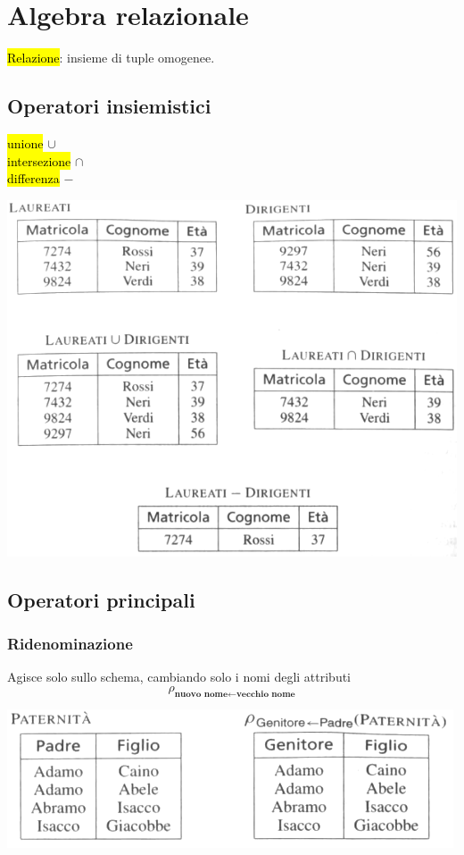 \documentclass[a4paper]{article}
\begin{document}
\section{Algebra relazionale}
\hl{Relazione}: insieme di tuple omogenee.

\subsection{Operatori insiemistici}
\hl{unione} $\cup$ \\
\hl{intersezione} $\cap$\\
\hl{differenza} $-$
\begin{center}
      \includegraphics[scale=0.45]{img/ar1.png}
\end{center}

\subsection{Operatori principali}
\subsubsection{Ridenominazione}
Agisce solo sullo schema, cambiando solo i nomi degli attributi
\[\rho_{\textbf{nuovo nome}\leftarrow \textbf{vecchio nome}}\]
\begin{center}
      \includegraphics[scale=0.45]{img/ar2.png}
\end{center}
\end{document}
